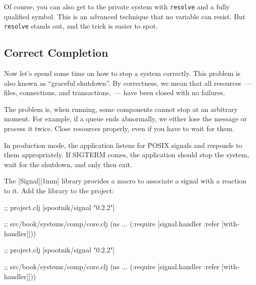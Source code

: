 Of course, you can also get to the private system with \verb|resolve| and a fully qualified symbol. This is an advanced technique that no variable can resist. But \verb|resolve| stands out, and the trick is easier to spot.

\subsection{Correct Completion}


Now let's spend some time on how to stop a system correctly. This problem is also known as ``graceful shutdown''. By correctness, we mean that all resources~--- files, connections, and transactions,~--- have been closed with no failures.

The problem is, when running, some components cannot stop at an arbitrary moment. For example, if a queue ends abnormally, we either lose the message or process it twice. Close resources properly, even if you have to wait for them.


In production mode, the application listens for POSIX signals and responds to them appropriately. If SIGTERM comes, the application should stop the system, wait for the shutdown, and only then exit.


The [Signal][1mm] library provides a macro to associate a signal with a reaction to it. Add the library to the project:

\ifnarrow

\begin{english}
  \begin{clojure}
;; project.clj
[spootnik/signal "0.2.2"]

;; src/book/systems/comp/core.clj
(ns ...
  (:require
   [signal.handler :refer
    [with-handler]]))
  \end{clojure}
\end{english}

\else

\begin{english}
  \begin{clojure}
;; project.clj
[spootnik/signal "0.2.2"]

;; src/book/systems/comp/core.clj
(ns ...
  (:require [signal.handler :refer [with-handler]]))
  \end{clojure}
\end{english}

